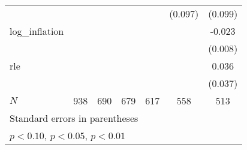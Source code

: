 {\begin{tabular}{l*{6}{c}}
            &                     &                     &                     &                     &     (0.097)         &     (0.099)         \\
\addlinespace
log\_inflation&                     &                     &                     &                     &                     &      -0.023\sym{***}\\
            &                     &                     &                     &                     &                     &     (0.008)         \\
\addlinespace
rle         &                     &                     &                     &                     &                     &       0.036         \\
            &                     &                     &                     &                     &                     &     (0.037)         \\
\midrule
\(N\)       &         938         &         690         &         679         &         617         &         558         &         513         \\
\bottomrule
\multicolumn{7}{l}{\footnotesize Standard errors in parentheses}\\
\multicolumn{7}{l}{\footnotesize \sym{*} \(p<0.10\), \sym{**} \(p<0.05\), \sym{***} \(p<0.01\)}\\
\end{tabular}
}
